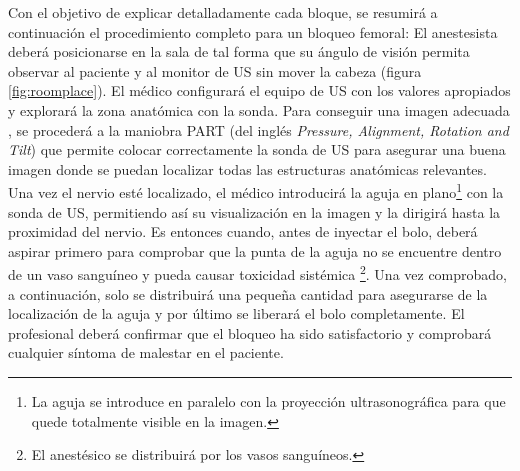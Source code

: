Con el objetivo de explicar detalladamente cada bloque, se resumirá a continuación el procedimiento completo para un bloqueo femoral:
%
El anestesista deberá posicionarse en la sala de tal forma que su ángulo de visión permita observar al paciente y al monitor de \ac{US} %
sin mover la cabeza (figura \ref{fig:roomplace}). El médico configurará el equipo de \ac{US} con los valores apropiados y explorará la zona anatómica con la sonda. Para conseguir una imagen adecuada %
, se procederá a la maniobra PART (del inglés \emph{Pressure, Alignment, Rotation and Tilt}) que permite colocar correctamente la sonda de \ac{US} para asegurar una buena imagen donde se puedan localizar todas las estructuras anatómicas relevantes. Una vez el nervio esté localizado, el médico introducirá la aguja en plano\footnote{La aguja se introduce en paralelo con la proyección ultrasonográfica para que quede totalmente visible en la imagen.} con la sonda de \ac{US}, permitiendo así su visualización en la imagen y la dirigirá hasta la proximidad del nervio. Es entonces cuando, antes de inyectar el bolo, deberá aspirar primero para comprobar que la punta de la aguja no se encuentre dentro de un vaso sanguíneo y pueda causar toxicidad sistémica \footnote{El anestésico se distribuirá por los vasos sanguíneos.}. Una vez comprobado, a continuación, solo se distribuirá una pequeña cantidad para asegurarse de la localización de la aguja y por último se liberará el bolo completamente. El profesional deberá confirmar que el bloqueo ha sido satisfactorio y comprobará cualquier síntoma de malestar en el paciente.


